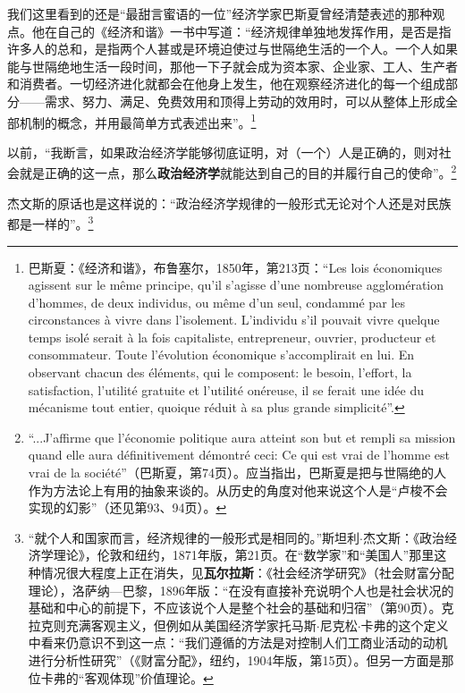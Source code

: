 \documentclass[fontset=fandol, a4paper, 12pt, openright]{ctexbook}
\begin{document}
我们这里看到的还是“最甜言蜜语的一位”经济学家巴斯夏曾经清楚表述的那种观点。他在自己的《经济和谐》一书中写道：“经济规律单独地发挥作用，是否是指许多人的总和，是指两个人甚或是环境迫使过与世隔绝生活的一个人。一个人如果能与世隔绝地生活一段时间，那他一下子就会成为资本家、企业家、工人、生产者和消费者。一切经济进化就都会在他身上发生，他在观察经济进化的每一个组成部分——需求、努力、满足、免费效用和顶得上劳动的效用时，可以从整体上形成全部机制的概念，并用最简单方式表述出来”。\footnote{巴斯夏：《经济和谐》，布鲁塞尔，1850年，第213页：“Les lois \'{e}conomiques agissent sur le m\^{e}me principe, qu'il s'agisse d'une nombreuse agglom\'{e}ration d'hommes, de deux individus, ou m\^{e}me d'un seul, condamm\'{e} par les circonstances \`{a} vivre dans l'isolement. L'individu s'il pouvait vivre quelque temps isol\'{e} serait \`{a} la fois capitaliste, entrepreneur, ouvrier, producteur et consommateur. Toute l'\'{e}volution \'{e}conomique s'accomplirait en lui. En observant chacun des \'{e}l\'{e}ments, qui le composent: le besoin, l'effort, la satisfaction, l'utilit\'{e} gratuite et l'utilit\'{e} on\'{e}reuse, il se ferait une id\'{e}e du m\'{e}canisme tout entier, quoique r\'{e}duit \`{a} sa plus grande simplicit\'{e}''.}

以前，“我断言，如果政治经济学能够彻底证明，对（一个）人是正确的，则对社会就是正确的这一点，那么\textbf{政治经济学}就能达到自己的目的并履行自己的使命”。\footnote{``...J'affirme que l'\'{e}conomie politique aura atteint son but et rempli sa mission quand elle aura d\'{e}finitivement d\'{e}montr\'{e} ceci: Ce qui est vrai de l'homme est vrai de la soci\'{e}t\'{e}''（巴斯夏，第74页）。应当指出，巴斯夏是把与世隔绝的人作为方法论上有用的抽象来谈的。从历史的角度对他来说这个人是“卢梭不会实现的幻影”（还见第93、94页）。}

杰文斯的原话也是这样说的：“政治经济学规律的一般形式无论对个人还是对民族都是一样的”。\footnote{“就个人和国家而言，经济规律的一般形式是相同的。”斯坦利$\cdot$杰文斯：《政治经济学理论》，伦敦和纽约，1871年版，第21页。在“数学家”和“美国人”那里这种情况很大程度上正在消失，见\textbf{瓦尔拉斯}：《社会经济学研究》（社会财富分配理论），洛萨纳—巴黎，1896年版：“在没有直接补充说明个人也是社会状况的基础和中心的前提下，不应该说个人是整个社会的基础和归宿”（第90页）。克拉克则充满客观主义，但例如从美国经济学家托马斯$\cdot$尼克松$\cdot$卡弗的这个定义中看来仍意识不到这一点：“我们遵循的方法是对控制人们工商业活动的动机进行分析性研究”（《财富分配》，纽约，1904年版，第15页）。但另一方面是那位卡弗的“客观体现”价值理论。}
\end{document}
